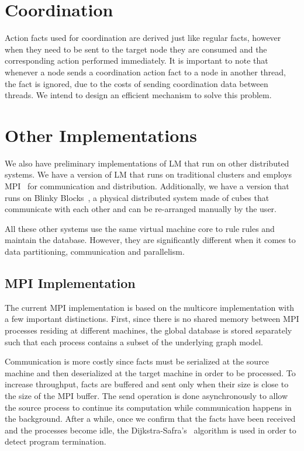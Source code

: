 \section{Coordination}

Action facts used for coordination are derived just like regular facts, however when they need to be sent to the target node
they are consumed and the corresponding action performed immediately.
It is important to note that whenever a node sends a coordination action fact to a node in another thread,
the fact is ignored, due to the costs of sending
coordination data between threads. We intend to design an efficient mechanism to solve this problem.

\section{Other Implementations}

We also have preliminary implementations of LM that run on other distributed systems.
We have a version of LM that runs on traditional clusters and employs MPI~\cite{gabriel04-open-mpi} for communication
and distribution. Additionally, we have a version that runs on Blinky Blocks~\cite{Kirby-chi11}, a physical distributed system
made of cubes that communicate with each other and can be re-arranged manually by the user.

All these other systems use the same virtual machine core to rule rules and maintain the database. However, they are significantly different
when it comes to data partitioning, communication and parallelism.

\subsection{MPI Implementation}

The current MPI implementation is based on the multicore implementation with a few important distinctions. First, since there is no shared
memory between MPI processes residing at different machines, the global database is stored separately such that each process contains a subset
of the underlying graph model.

Communication is more costly since facts must be serialized at the source machine and then deserialized
at the target machine in order to be processed. To increase throughput, facts are buffered and sent only when their size is close to the size of the MPI buffer.
The send operation is done asynchronously to allow the source process to continue its computation while communication happens in the background.
After a while, once we confirm that the facts have been received and the processes become idle, the Dijkstra-Safra's~\cite{safras87} algorithm
is used in order to detect program termination.

